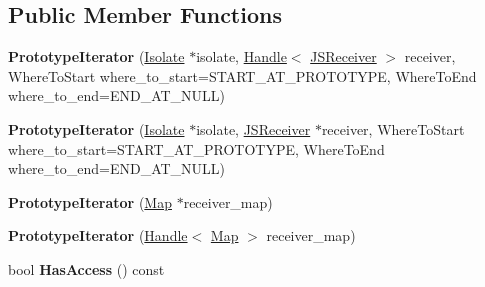\subsection*{Public Member Functions}
\begin{DoxyCompactItemize}
\item 
{\bfseries Prototype\+Iterator} (\hyperlink{classv8_1_1internal_1_1_isolate}{Isolate} $\ast$isolate, \hyperlink{classv8_1_1internal_1_1_handle}{Handle}$<$ \hyperlink{classv8_1_1internal_1_1_j_s_receiver}{J\+S\+Receiver} $>$ receiver, Where\+To\+Start where\+\_\+to\+\_\+start=S\+T\+A\+R\+T\+\_\+\+A\+T\+\_\+\+P\+R\+O\+T\+O\+T\+Y\+PE, Where\+To\+End where\+\_\+to\+\_\+end=E\+N\+D\+\_\+\+A\+T\+\_\+\+N\+U\+LL)\hypertarget{classv8_1_1internal_1_1_prototype_iterator_a5c7bbed7eb72258319fbb58ac03a0f9d}{}\label{classv8_1_1internal_1_1_prototype_iterator_a5c7bbed7eb72258319fbb58ac03a0f9d}

\item 
{\bfseries Prototype\+Iterator} (\hyperlink{classv8_1_1internal_1_1_isolate}{Isolate} $\ast$isolate, \hyperlink{classv8_1_1internal_1_1_j_s_receiver}{J\+S\+Receiver} $\ast$receiver, Where\+To\+Start where\+\_\+to\+\_\+start=S\+T\+A\+R\+T\+\_\+\+A\+T\+\_\+\+P\+R\+O\+T\+O\+T\+Y\+PE, Where\+To\+End where\+\_\+to\+\_\+end=E\+N\+D\+\_\+\+A\+T\+\_\+\+N\+U\+LL)\hypertarget{classv8_1_1internal_1_1_prototype_iterator_a028c33fd3c3c5e496506c0fc8d58a904}{}\label{classv8_1_1internal_1_1_prototype_iterator_a028c33fd3c3c5e496506c0fc8d58a904}

\item 
{\bfseries Prototype\+Iterator} (\hyperlink{classv8_1_1internal_1_1_map}{Map} $\ast$receiver\+\_\+map)\hypertarget{classv8_1_1internal_1_1_prototype_iterator_a65096861a41353f1f2da75d57bdd00e5}{}\label{classv8_1_1internal_1_1_prototype_iterator_a65096861a41353f1f2da75d57bdd00e5}

\item 
{\bfseries Prototype\+Iterator} (\hyperlink{classv8_1_1internal_1_1_handle}{Handle}$<$ \hyperlink{classv8_1_1internal_1_1_map}{Map} $>$ receiver\+\_\+map)\hypertarget{classv8_1_1internal_1_1_prototype_iterator_abda62e063f1b70a4d4248c579627c5ba}{}\label{classv8_1_1internal_1_1_prototype_iterator_abda62e063f1b70a4d4248c579627c5ba}

\item 
bool {\bfseries Has\+Access} () const \hypertarget{classv8_1_1internal_1_1_prototype_iterator_a1155ca9587ead8da4a47b948e1373220}{}\label{classv8_1_1internal_1_1_prototype_iterator_a1155ca9587ead8da4a47b948e1373220}


\end{DoxyCompactItemize}
